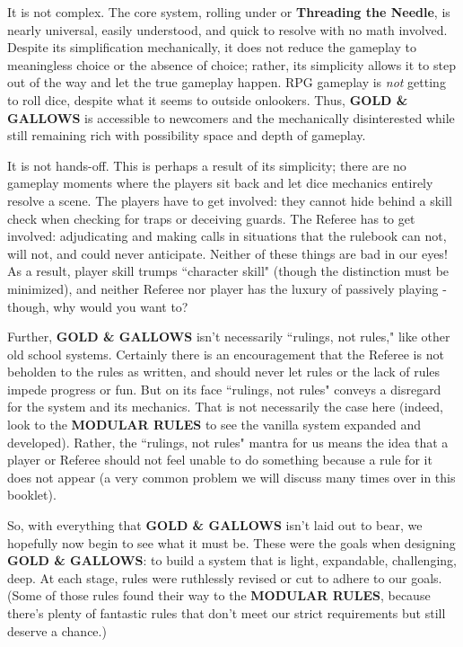 \documentclass[twoside]{article}
\begin{document}
It is not complex. The core system, rolling under or \textbf{Threading the Needle}, is nearly universal, easily understood, and quick to resolve with no math involved. Despite its simplification mechanically, it does not reduce the gameplay to meaningless choice or the absence of choice; rather, its simplicity allows it to step out of the way and let the true gameplay happen. RPG gameplay is \textit{not} getting to roll dice, despite what it seems to outside onlookers. Thus, \textbf{GOLD \& GALLOWS} is accessible to newcomers and the mechanically disinterested while still remaining rich with possibility space and depth of gameplay.

\bigbreak

It is not hands-off. This is perhaps a result of its simplicity; there are no gameplay moments where the players sit back and let dice mechanics entirely resolve a scene. The players have to get involved: they cannot hide behind a skill check when checking for traps or deceiving guards. The Referee has to get involved: adjudicating and making calls in situations that the rulebook can not, will not, and could never anticipate. Neither of these things are bad in our eyes! As a result, player skill trumps ``character skill" (though the distinction must be minimized), and neither Referee nor player has the luxury of passively playing - though, why would you want to?

\bigbreak

Further, \textbf{GOLD \& GALLOWS} isn't necessarily ``rulings, not rules," like other old school systems. Certainly there is an encouragement that the Referee is not beholden to the rules as written, and should never let rules or the lack of rules impede progress or fun. But on its face ``rulings, not rules" conveys a disregard for the system and its mechanics. That is not necessarily the case here (indeed, look to the \textbf{MODULAR RULES} to see the vanilla system expanded and developed). Rather, the ``rulings, not rules" mantra for us means the idea that a player or Referee should not feel unable to do something because a rule for it does not appear (a very common problem we will discuss many times over in this booklet).

\bigbreak

So, with everything that \textbf{GOLD \& GALLOWS} isn't laid out to bear, we hopefully now begin to see what it must be. These were the goals when designing \textbf{GOLD \& GALLOWS}: to build a system that is light, expandable, challenging, deep. At each stage, rules were ruthlessly revised or cut to adhere to our goals. (Some of those rules found their way to the \textbf{MODULAR RULES}, because there's plenty of fantastic rules that don't meet our strict requirements but still deserve a chance.)
\end{document}
